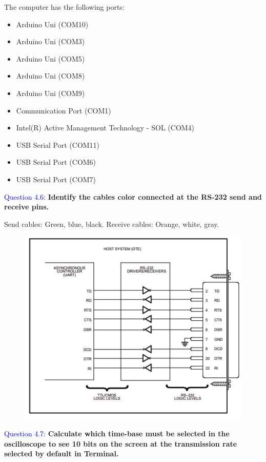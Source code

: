 \documentclass[12pt, a4papre]{article}
\begin{document}
	The computer has the following ports:
	
	\begin{itemize}
		\item Arduino Uni (COM10)
		\item Arduino Uni (COM3)
		\item Arduino Uni (COM5)
		\item Arduino Uni (COM8)
		\item Arduino Uni (COM9)
		\item Communication Port (COM1)
		\item Intel(R) Active Management Technology - SOL (COM4)
		\item USB Serial Port (COM11)
		\item USB Serial Port (COM6)
		\item USB Serial Port (COM7)
	\end{itemize}
	
	\textcolor{blue}{Question 4.6:}  \textbf{Identify the cables color connected at the RS-232 send and receive pins.}
	
	Send cables: Green, blue, black.
	Receive cables: Orange, white, gray.
	
	\begin{figure}[H]
		\begin{center}
		\includegraphics[width=130mm]{Foto4_6.png}
		\end{center}
	\end{figure}


	\textcolor{blue}{Question 4.7:}  \textbf{Calculate which time-base must be selected in the oscilloscope to see 10 bits on the screen at the transmission rate selected by default in Terminal. }
	
\end{document}
